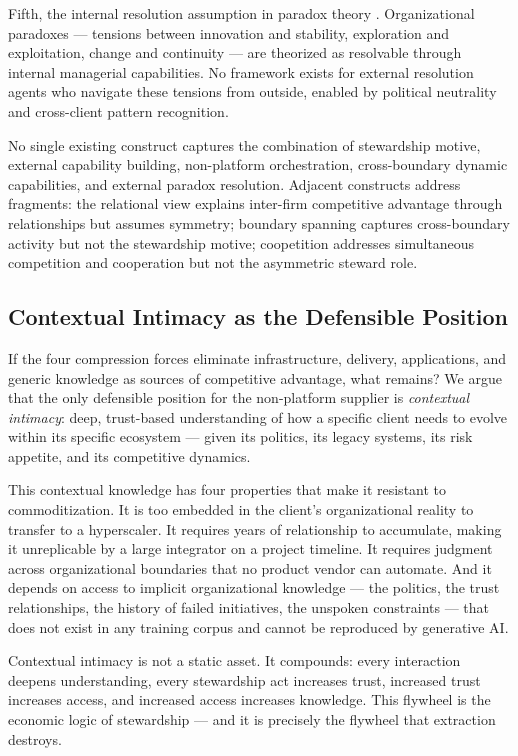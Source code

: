 Fifth, the internal resolution assumption in paradox theory \citep{Smith2011}. Organizational paradoxes --- tensions between innovation and stability, exploration and exploitation, change and continuity --- are theorized as resolvable through internal managerial capabilities. No framework exists for external resolution agents who navigate these tensions from outside, enabled by political neutrality and cross-client pattern recognition.

No single existing construct captures the combination of stewardship motive, external capability building, non-platform orchestration, cross-boundary dynamic capabilities, and external paradox resolution. Adjacent constructs address fragments: the relational view \citep{DyerSingh1998} explains inter-firm competitive advantage through relationships but assumes symmetry; boundary spanning captures cross-boundary activity but not the stewardship motive; coopetition \citep{nalebuff1996coopetition} addresses simultaneous competition and cooperation but not the asymmetric steward role.

\subsection{Contextual Intimacy as the Defensible Position}

If the four compression forces eliminate infrastructure, delivery, applications, and generic knowledge as sources of competitive advantage, what remains? We argue that the only defensible position for the non-platform supplier is \emph{contextual intimacy}: deep, trust-based understanding of how a specific client needs to evolve within its specific ecosystem --- given its politics, its legacy systems, its risk appetite, and its competitive dynamics.

This contextual knowledge has four properties that make it resistant to commoditization. It is too embedded in the client's organizational reality to transfer to a hyperscaler. It requires years of relationship to accumulate, making it unreplicable by a large integrator on a project timeline. It requires judgment across organizational boundaries that no product vendor can automate. And it depends on access to implicit organizational knowledge --- the politics, the trust relationships, the history of failed initiatives, the unspoken constraints --- that does not exist in any training corpus and cannot be reproduced by generative AI.

Contextual intimacy is not a static asset. It compounds: every interaction deepens understanding, every stewardship act increases trust, increased trust increases access, and increased access increases knowledge. This flywheel is the economic logic of stewardship --- and it is precisely the flywheel that extraction destroys.

